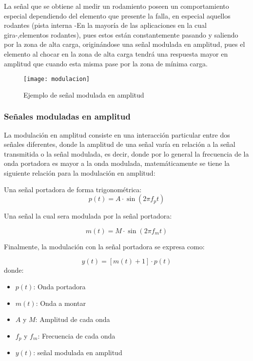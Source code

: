             La señal que se obtiene al medir un rodamiento poseen un comportamiento especial dependiendo del elemento que presente la falla, en especial aquellos rodantes (pista interna -En la mayoría de las aplicaciones en la cual gira-,elementos rodantes), pues estos están constantemente pasando y saliendo por la zona de alta carga, originándose una señal modulada en amplitud, pues el elemento al chocar en la zona de alta carga tendrá una respuesta mayor en amplitud que cuando esta misma pase por la zona de mínima carga.
         	\begin{figure}
        		\centering
        		\texttt{[image: modulacion]}
        		\caption{Ejemplo de señal modulada en amplitud}
        		\label{fig:modulacion}
        	\end{figure}
	
		    \subsubsection{Señales moduladas en amplitud}
    			La modulación en amplitud consiste en una interacción particular entre dos señales diferentes, donde la amplitud de una señal varía en relación a la señal transmitida o la señal modulada, es decir, donde por lo general la frecuencia de la onda portadora es mayor a la onda modulada, matemáticamente se tiene la siguiente relación para la modulación en amplitud: 
    			
    			Una señal portadora de forma trigonométrica:\\
    			
    			\begin{equation}
    				p(t) = A \cdot \sin \left(2 \pi f_{p}t \right)			
    			\end{equation}
    			
    			Una señal la cual sera modulada por la señal portadora: 
    			
    			\begin{equation}
    				m(t)= M \cdot \sin \left(2 \pi f_{m} t \right) 
    			\end{equation}
    			
    			Finalmente, la modulación con la señal portadora se expresa como: 
    			
    			\begin{equation}
    				y(t)=\left[m(t)+1\right ]\cdot p(t)				
    			\end{equation}
    			donde: 
    			
    			\begin{itemize}
    				\item $p(t)$: Onda portadora
    				\item $m(t)$: Onda a montar
    				\item $A$ y $M$: Amplitud de cada onda
    				\item $f_{p}$ y $f_{m}$: Frecuencia de cada onda
    				\item $y(t)$: señal modulada en amplitud
    			\end{itemize}
    			
